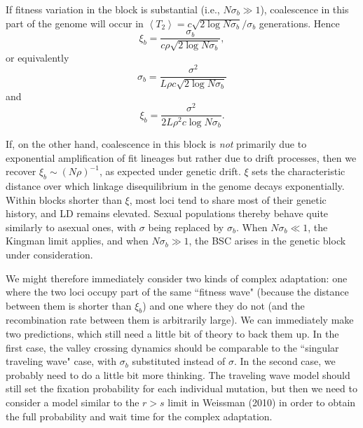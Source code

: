 \documentclass[10pt]{revtex4}
\begin{document}
If fitness variation in the block is substantial (i.e., $N\sigma_b \gg 1$), coalescence in this part of the genome will occur in $\left< T_2 \right> = c \sqrt{2\log N\sigma_b}/\sigma_b$ generations.
Hence
\begin{equation}
\xi_b = \frac{\sigma_b}{c\rho\sqrt{2\log N\sigma_b}},
\end{equation}
or equivalently
\begin{equation}
\sigma_b = \frac{\sigma^2}{L\rho c \sqrt{2 \log N\sigma_b}}
\end{equation}
and
\begin{equation}
\xi_b = \frac{\sigma^2}{2L\rho^2 c \log N\sigma_b}.
\end{equation}

If, on the other hand, coalescence in this block is \emph{not} primarily due to exponential amplification of fit lineages but rather due to drift processes, then we recover $\xi_b \sim (N\rho)^{-1}$, as expected under genetic drift.
$\xi$ sets the characteristic distance over which linkage disequilibrium in the genome decays exponentially.
Within blocks shorter than $\xi$, most loci tend to share most of their genetic history, and LD remains elevated.
Sexual populations thereby behave quite similarly to asexual ones, with $\sigma$ being replaced by $\sigma_b$.
When $N\sigma_b \ll 1$, the Kingman limit applies, and when $N\sigma_b \gg 1$, the BSC arises in the genetic block under consideration.

We might therefore immediately consider two kinds of complex adaptation: one where the two loci occupy part of the same ``fitness wave" (because the distance between them is shorter than $\xi_b$) and one where they do not (and the recombination rate between them is arbitrarily large).
We can immediately make two predictions, which still need a little bit of theory to back them up.
In the first case, the valley crossing dynamics should be comparable to the ``singular traveling wave" case, with $\sigma_b$ substituted instead of $\sigma$.
In the second case, we probably need to do a little bit more thinking.
The traveling wave model should still set the fixation probability for each individual mutation, but then we need to consider a model similar to the $r > s$ limit in Weissman (2010) in order to obtain the full probability and wait time for the complex adaptation.
\end{document}
